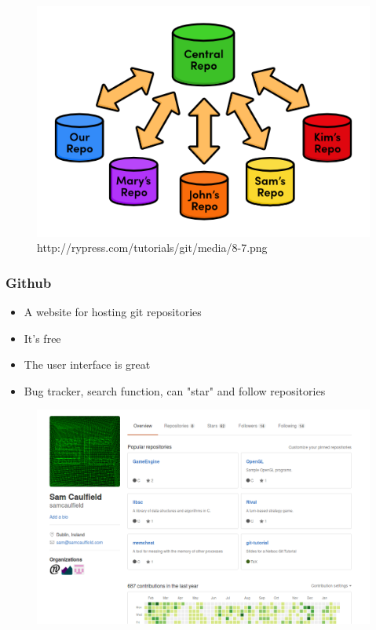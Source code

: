 \documentclass{beamer}
\begin{document}
\begin{frame}
\begin{figure}
\begin{center}
\includegraphics[scale=0.7]{centralised}
\caption{http://rypress.com/tutorials/git/media/8-7.png}
\end{center}
\end{figure}
\end{frame}

\begin{frame}
\frametitle{Github}
\begin{itemize}
\item A website for hosting git repositories
\item It's free
\item The user interface is great
\item Bug tracker, search function, can "star" and follow repositories
\end{itemize}
\end{frame}

\begin{frame}
\begin{figure}
\begin{center}
\includegraphics[scale=0.3]{githubmain}
\end{center}
\end{figure}
\end{frame}
\end{document}
